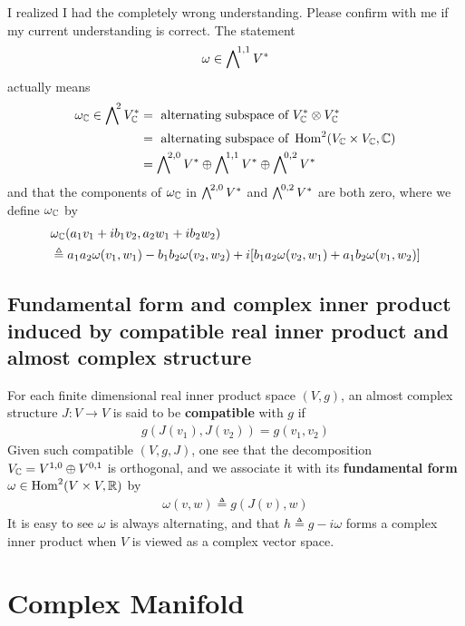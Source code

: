 \documentclass{report}
\begin{document}
I realized I had the completely wrong understanding. Please confirm with me if my current understanding is correct. The statement   
\begin{align}
\omega \in \extp^{1,1}V^*
\end{align}
actually means 
\begin{align}
  \omega_\C \in \extp^2 V_\C^* &=\text{ alternating subspace of } V_\C^* \otimes V_\C^* \\
  &=\text{ alternating subspace of }\operatorname{Hom}^2(V_\C\times V_\C ,\C)\\
  &=\extp^{2,0}V^* \oplus \extp^{1,1}V^* \oplus \extp^{0,2}V^*
\end{align}
and that the components of $\omega_{\mathbb{C}}$ in $\extp^{2,0}V^*$ and $\extp^{0,2}V^*$ are both zero, where we define $\omega_{\mathbb{C}}$ by 
\begin{align}
&\omega_{\mathbb{C}} (a_1v_1+ib_1v_2, a_2w_1+ib_2w_2)\\
&\triangleq a_1a_2\omega(v_1,w_1)-b_1b_2\omega(v_2,w_2)+ i[b_1a_2\omega (v_2,w_1)+a_1b_2\omega (v_1,w_2)]
\end{align}


\section{Fundamental form and complex inner product induced by compatible real inner product and almost complex structure}
For each finite dimensional real inner product space $(V,g)$, an almost complex structure $J:V\rightarrow V$ is said to be \textbf{compatible} with $g$ if 
\begin{align*}
g(J(v_1),J(v_2))=g(v_1,v_2)
\end{align*}
Given such compatible $(V,g,J)$, one see that the decomposition $V_{\mathbb{C}}=V^{1,0}\oplus V^{0,1}$ is orthogonal, and we associate it with its \textbf{fundamental form} $\omega\in \operatorname{Hom}^2(V\times V,\mathbb{R})$ by 
\begin{align*}
\omega (v,w)\triangleq  g(J(v),w)
\end{align*}
It is easy to see $\omega$ is always alternating, and that $h\triangleq g- i \omega$ forms a complex inner product when $V$ is viewed as a complex vector space. 

\chapter{Complex Manifold}
\end{document}
